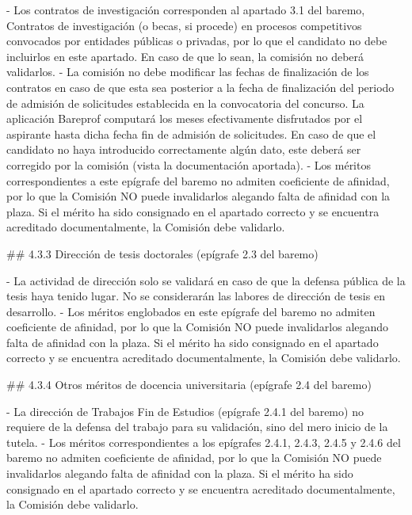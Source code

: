 \documentclass{article}
\begin{document}
\begin{itemize}
\begin{itemize}
\begin{scriptsize}
                  - Los contratos de investigación corresponden al apartado 3.1 del baremo, Contratos de investigación (o becas, si procede) en procesos competitivos convocados por entidades públicas o privadas, por lo que el candidato no debe incluirlos en este apartado. En caso de que lo sean, la comisión no deberá validarlos.
                  - La comisión no debe modificar las fechas de finalización de los contratos en caso de que esta sea posterior a la fecha de finalización del periodo de admisión de solicitudes establecida en la convocatoria del concurso. La aplicación Bareprof computará los meses efectivamente disfrutados por el aspirante hasta dicha fecha fin de admisión de solicitudes. En caso de que el candidato no haya introducido correctamente algún dato, este deberá ser corregido por la comisión (vista la documentación aportada).
                  - Los méritos correspondientes a este epígrafe del baremo no admiten coeficiente de afinidad, por lo que la Comisión NO puede invalidarlos alegando falta de afinidad con la plaza. Si el mérito ha sido consignado en el apartado correcto y se encuentra acreditado documentalmente, la Comisión debe validarlo.

                  \#\# 4.3.3 Dirección de tesis doctorales (epígrafe 2.3 del baremo)

                  - La actividad de dirección solo se validará en caso de que la defensa pública de la tesis haya tenido lugar. No se considerarán las labores de dirección de tesis en desarrollo.
                  - Los méritos englobados en este epígrafe del baremo no admiten coeficiente de afinidad, por lo que la Comisión NO puede invalidarlos alegando falta de afinidad con la plaza. Si el mérito ha sido consignado en el apartado correcto y se encuentra acreditado documentalmente, la Comisión debe validarlo.

                  \#\# 4.3.4 Otros méritos de docencia universitaria (epígrafe 2.4 del baremo)

                  - La dirección de Trabajos Fin de Estudios (epígrafe 2.4.1 del baremo) no requiere de la defensa del trabajo para su validación, sino del mero inicio de la tutela.
                  - Los méritos correspondientes a los epígrafes 2.4.1, 2.4.3, 2.4.5 y 2.4.6 del baremo no admiten coeficiente de afinidad, por lo que la Comisión NO puede invalidarlos alegando falta de afinidad con la plaza. Si el mérito ha sido consignado en el apartado correcto y se encuentra acreditado documentalmente, la Comisión debe validarlo.


\end{scriptsize}
\end{itemize}
\end{itemize}
\end{document}
